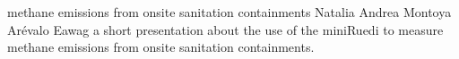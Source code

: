 \begin{conf-abstract}
{methane emissions from onsite sanitation containments}
{Natalia Andrea Montoya Arévalo}
{Eawag}
{a short presentation about the use of the miniRuedi to measure methane emissions from onsite sanitation containments.}
\end{conf-abstract}
